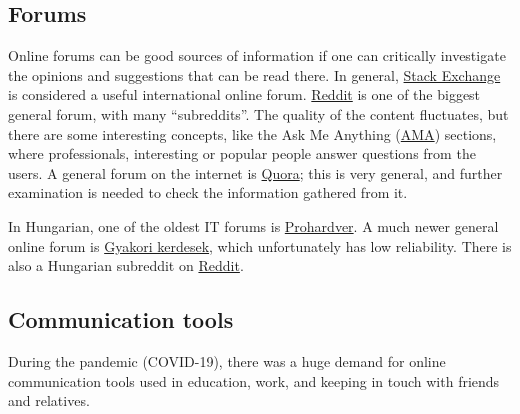 \documentclass{article}
\begin{document}
\subsection{Forums}

Online forums can be good sources of information if one can critically investigate the opinions and suggestions that can be read there. In general, \href{https://stackexchange.com/sites#}{Stack Exchange} is considered a useful international online forum.
\href{https://www.reddit.com/}{Reddit} is one of the biggest general forum, with many ``subreddits''. The quality of the content fluctuates, but there are some interesting concepts, like the Ask Me Anything (\href{https://www.reddit.com/r/AMA/}{AMA}) sections, where professionals, interesting or popular people answer questions from the users.
A general forum on the internet is \href{https://www.quora.com/Where-is-the-list-of-all-the-topics-on-Quora}{Quora}; this is very general, and further examination is needed to check the information gathered from it.

In Hungarian, one of the oldest IT forums is \href{https://prohardver.hu/forum/index.html}{Prohardver}. A much newer general online forum is \href{https://www.gyakorikerdesek.hu/}{Gyakori kerdesek}, which unfortunately has low reliability.
There is also a Hungarian subreddit on \href{https://www.reddit.com/r/hungary/}{Reddit}.

\subsection{Communication tools}

During the pandemic (COVID-19), there was a huge demand for online communication tools used in education, work, and keeping in touch with friends and relatives.
\end{document}
